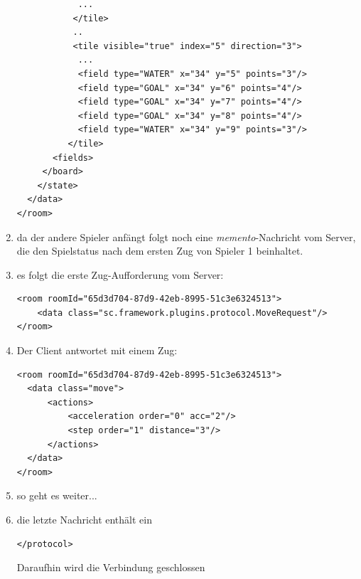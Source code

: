 \documentclass[12pt,a4paper, ngerman, oneside]{scrartcl}
\begin{document}
\begin{enumerate}
\begin{verbatim}
            ...
           </tile>
           ..
           <tile visible="true" index="5" direction="3">
            ...
            <field type="WATER" x="34" y="5" points="3"/>
            <field type="GOAL" x="34" y="6" points="4"/>
            <field type="GOAL" x="34" y="7" points="4"/>
            <field type="GOAL" x="34" y="8" points="4"/>
            <field type="WATER" x="34" y="9" points="3"/>
          </tile>
       <fields>
     </board>
    </state>
  </data>
</room>
\end{verbatim}
\item da der andere Spieler anfängt folgt noch eine \textit{memento}-Nachricht vom Server, die den Spielstatus nach dem ersten Zug von Spieler 1 beinhaltet.
\item es folgt die erste Zug-Aufforderung vom Server: \begin{verbatim}
<room roomId="65d3d704-87d9-42eb-8995-51c3e6324513">
    <data class="sc.framework.plugins.protocol.MoveRequest"/>
</room>
\end{verbatim}
\item Der Client antwortet mit einem Zug: \begin{verbatim}
<room roomId="65d3d704-87d9-42eb-8995-51c3e6324513">
  <data class="move">
      <actions>
    	  <acceleration order="0" acc="2"/>
    	  <step order="1" distance="3"/>
      </actions>
  </data>
</room>
\end{verbatim}
\item so geht es weiter...
\item die letzte Nachricht enthält ein \begin{verbatim}
</protocol>
\end{verbatim}
Daraufhin wird die Verbindung geschlossen
\end{enumerate}
\end{document}
